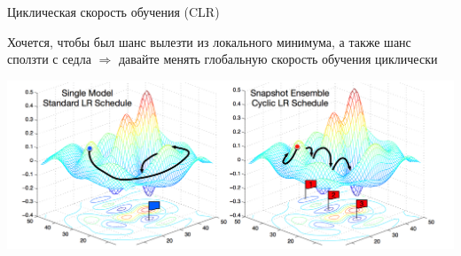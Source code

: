 \documentclass[notes,12pt, aspectratio=169]{beamer}
\newenvironment{wideitemize}{\itemize\addtolength{\itemsep}{10pt}}{\enditemize}
\begin{document}
\begin{frame}{Циклическая скорость обучения (CLR)}
\begin{wideitemize}
	\item Хочется, чтобы был шанс вылезти из локального минимума, а также шанс сползти с седла $\Rightarrow$ давайте менять глобальную скорость обучения циклически
\end{wideitemize}
\begin{center}
	\includegraphics[width=0.7\paperwidth]{cycle_sgd.png}
\end{center}
\end{frame}
\end{document}
